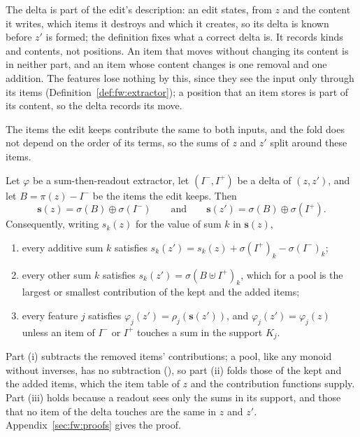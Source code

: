 \noindent The delta is part of the edit's description: an edit states, from $z$ and the content it writes, which items
it destroys and which it creates, so its delta is known before $z'$ is formed; the definition fixes what a correct
delta is. It records kinds and contents, not positions. An item that moves without changing its content is in neither
part, and an item whose content changes is one removal and one addition. The features lose nothing by this, since they
see the input only through its items (Definition~\ref{def:fw:extractor}); a position that an item stores is part of
its content, so the delta records its move.

The items the edit keeps contribute the same to both inputs, and the fold does not depend on the order of its terms,
so the sums of $z$ and $z'$ split around these items.

\label{prop:fw:side-effects}
{
Let $\varphi$ be a sum-then-readout extractor, let $(I^-, I^+)$ be a delta of $(z, z')$, and let
$B = \pi(z) - I^-$ be the items the edit keeps. Then
\begin{equation}
  \mathbf{s}(z) = \sigma(B) \oplus \sigma(I^-)
  \qquad \text{and} \qquad
  \mathbf{s}(z') = \sigma(B) \oplus \sigma(I^+).
\end{equation}
Consequently, writing $s_k(z)$ for the value of sum $k$ in $\mathbf{s}(z)$,
\begin{enumerate}[label=(\roman*), leftmargin=*, nosep]
  \item every additive sum $k$ satisfies $s_k(z') = s_k(z) + \sigma(I^+)_k - \sigma(I^-)_k$;
  \item every other sum $k$ satisfies $s_k(z') = \sigma(B \uplus I^+)_k$, which for a pool is the largest or
    smallest contribution of the kept and the added items;
  \item every feature $j$ satisfies $\varphi_j(z') = \rho_j(\mathbf{s}(z'))$, and
    $\varphi_j(z') = \varphi_j(z)$ unless an item of $I^-$ or $I^+$ touches a sum in the support $K_j$.
\end{enumerate}
}

\noindent Part (i) subtracts the removed items' contributions; a pool, like any monoid without inverses, has no
subtraction (), so part (ii) folds those of the kept and the added items, which the item table of
$z$ and the contribution functions supply. Part (iii) holds because a readout sees only the sums in its support, and
those that no item of the delta touches are the same in $z$ and $z'$. Appendix~\ref{sec:fw:proofs} gives the proof.


